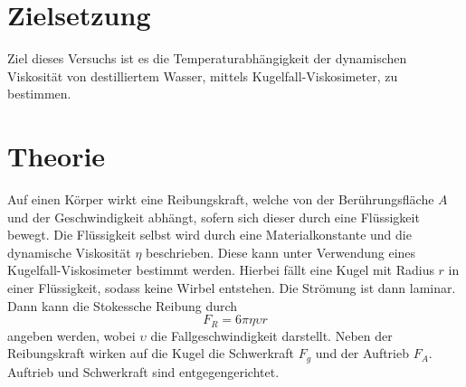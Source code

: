 \section{Zielsetzung}
Ziel dieses Versuchs ist es die Temperaturabhängigkeit der dynamischen Viskosität von destilliertem Wasser, mittels Kugelfall-Viskosimeter, zu bestimmen.
\section{Theorie}
\label{sec:Theorie}
Auf einen Körper wirkt eine Reibungskraft, welche von der Berührungsfläche $A$ und der Geschwindigkeit abhängt, sofern sich dieser durch eine Flüssigkeit bewegt.
Die Flüssigkeit selbst wird durch eine Materialkonstante und die dynamische Viskosität $\eta$ beschrieben.
Diese kann unter Verwendung eines Kugelfall-Viskosimeter bestimmt werden.
Hierbei fällt eine Kugel mit Radius $r$ in einer Flüssigkeit, sodass keine Wirbel entstehen.
Die Strömung ist dann laminar.
Dann kann die Stokessche Reibung durch
\begin{equation}
  F_R = 6 \pi \eta \upsilon r
\end{equation}
angeben werden, wobei $\upsilon$ die Fallgeschwindigkeit darstellt.
Neben der Reibungskraft wirken auf die Kugel die Schwerkraft $F_g$ und der Auftrieb $F_A$.
Auftrieb und Schwerkraft sind entgegengerichtet.
